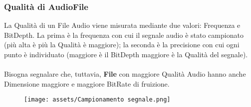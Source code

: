\documentclass{article}
\begin{document}
\subsubsection{Qualità di AudioFile}
La Qualità di un File Audio viene misurata mediante due valori: Frequenza e BitDepth. La prima è la frequenza con cui il segnale audio è stato campionato (più alta è più la Qualità è maggiore); la seconda è la precisione con cui ogni punto è individuato (maggiore è il BitDepth maggiore è la Qualità del segnale).
\\ \\
Bisogna segnalare che, tuttavia, \textbf{File} con maggiore Qualità Audio hanno anche Dimensione maggiore e maggiore BitRate di fruizione. \\
%
%
%
%
%
%
%
%
\begin{figure}
    \centering
    \texttt{[image: assets/Campionamento segnale.png]}
    \label{fig:Campionamento segnale spiegazione BitDepth e Frequenza}
\end{figure}
\end{document}
